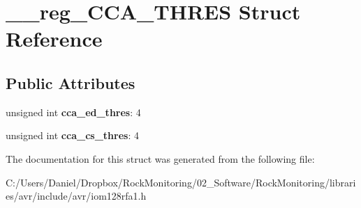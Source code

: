 \hypertarget{struct____reg___c_c_a___t_h_r_e_s}{}\section{\+\_\+\+\_\+reg\+\_\+\+C\+C\+A\+\_\+\+T\+H\+R\+ES Struct Reference}
\label{struct____reg___c_c_a___t_h_r_e_s}
\subsection*{Public Attributes}
\begin{DoxyCompactItemize}
\item 
unsigned int {\bfseries cca\+\_\+ed\+\_\+thres}\+: 4\hypertarget{struct____reg___c_c_a___t_h_r_e_s_a67842164128c764574f7ce1bb9f539a5}{}\label{struct____reg___c_c_a___t_h_r_e_s_a67842164128c764574f7ce1bb9f539a5}

\item 
unsigned int {\bfseries cca\+\_\+cs\+\_\+thres}\+: 4\hypertarget{struct____reg___c_c_a___t_h_r_e_s_ababeb9911a8ca78ac9d61b2147f3a592}{}\label{struct____reg___c_c_a___t_h_r_e_s_ababeb9911a8ca78ac9d61b2147f3a592}

\end{DoxyCompactItemize}


The documentation for this struct was generated from the following file\+:\begin{DoxyCompactItemize}
\item 
C\+:/\+Users/\+Daniel/\+Dropbox/\+Rock\+Monitoring/02\+\_\+\+Software/\+Rock\+Monitoring/libraries/avr/include/avr/iom128rfa1.\+h\end{DoxyCompactItemize}

